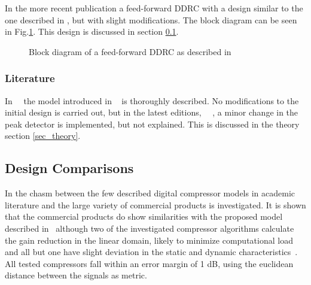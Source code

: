 \documentclass[../main2.tex]{subfiles}
\providecommand{\rootdir}{..}
\begin{document}
In the more recent publication \cite{reiss2012tutorial} a feed-forward DDRC with a design similar to the one described in  \cite{mcnally1984dynamic}, but with slight modifications. The block diagram can be seen in Fig.\ref{fig:block_giannoulis}. This design is discussed in section \ref{background_design_comp}.
\begin{figure}
\centerline{}
\caption{Block diagram of a feed-forward DDRC as described in \cite{reiss2012tutorial}}
\label{fig:block_giannoulis}
\end{figure}

\subsubsection{Literature}
In~\cite{zolzer1997digital}~\cite{dafx02} the model introduced in ~\cite{mcnally1984dynamic} is thoroughly described. No modifications to the initial design is carried out, but in the latest editions,~\cite{zoelzer2008digital} ~\cite{dafx11}, a minor change in the peak detector is implemented, but not explained. This is discussed in the theory section \ref{sec_theory}.
\subsection{Design Comparisons} \label{background_design_comp}
In \cite{bitzer2006parameter} the chasm between the few described digital compressor models in academic literature and the large variety of commercial products is investigated. It is shown that the commercial products do show similarities with the proposed model described in~\cite{mcnally1984dynamic}\cite{zolzer2008digital}\cite{dafx11} although two of the investigated compressor algorithms calculate the gain reduction in the linear domain, likely to minimize computational load and all but one have slight deviation in the static and dynamic characteristics~\cite{bitzer2006parameter}. All tested compressors fall within an error margin of 1 dB, using the euclidean distance between the signals as metric.
\end{document}
